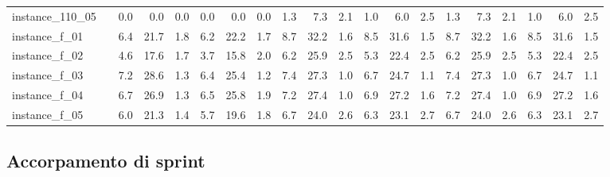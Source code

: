 \documentclass[12pt,a4paper,openright,twoside]{book}
\begin{document}
\begin{table}[H]
{\begin{tabular}{|ll|rrrrrr|rrrrrr|rrrrrr|}
 instance\_110\_05            &     &     0.0  &   0.0  &  0.0  &   0.0  &   0.0  &  0.0  &        1.3  &   7.3  &  2.1  &   1.0  &   6.0  &  2.5  &      1.3  &   7.3  &  2.1  &   1.0  &   6.0  &  2.5    \\  
 instance\_f\_01              &     &     6.4  &   21.7  &  1.8  &   6.2  &   22.2  &  1.7  &         8.7  &   32.2  &  1.6  &   8.5  &   31.6  &  1.5  &    8.7  &   32.2  &  1.6  &   8.5  &   31.6  &  1.5   \\   
 instance\_f\_02              &     &     4.6  &   17.6  &  1.7  &   3.7  &   15.8  &  2.0  &         6.2  &   25.9  &  2.5  &   5.3  &   22.4  &  2.5  &    6.2  &   25.9  &  2.5  &   5.3  &   22.4  &  2.5   \\   
 instance\_f\_03              &     &     7.2  &   28.6  &  1.3  &   6.4  &   25.4  &  1.2  &         7.4  &   27.3  &  1.0  &   6.7  &   24.7  &  1.1  &    7.4  &   27.3  &  1.0  &   6.7  &   24.7  &  1.1   \\   
 instance\_f\_04              &     &     6.7  &   26.9  &  1.3  &   6.5  &   25.8  &  1.9  &         7.2  &   27.4  &  1.0  &   6.9  &   27.2  &  1.6  &    7.2  &   27.4  &  1.0  &   6.9  &   27.2  &  1.6   \\   
 instance\_f\_05              &     &     6.0  &   21.3  &  1.4  &   5.7  &   19.6  &  1.8  &         6.7  &   24.0  &  2.6  &   6.3  &   23.1  &  2.7  &    6.7  &   24.0  &  2.6  &   6.3  &   23.1  &  2.7   \\   
  \hline
\end{tabular}
}
\end{table}

\subsection{Accorpamento di sprint}
\end{document}
